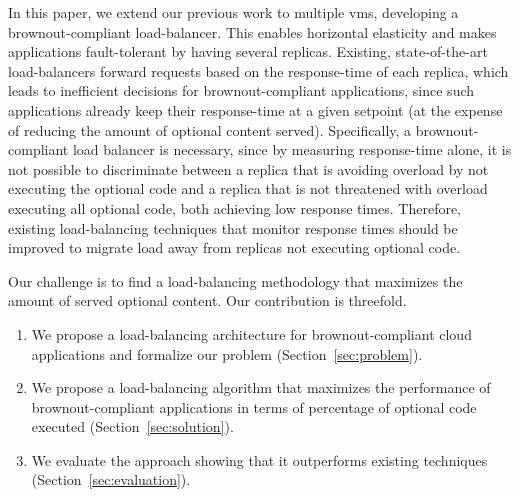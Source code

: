 In this paper, we extend our previous work to multiple \acp{vm},
developing a brownout-compliant load-balancer. This enables horizontal
elasticity and makes applications fault-tolerant by having several
replicas. Existing, state-of-the-art load-balancers forward requests based
on the response-time of each replica, which leads to inefficient
decisions for brownout-compliant applications, since such applications
already keep their response-time at a given setpoint (at the expense
of reducing the amount of optional content served). Specifically, a
brownout-compliant load balancer is necessary, since by measuring response-time alone,
it is not
possible to discriminate between a replica that is avoiding overload
by not executing the optional code and a replica that is not threatened with overload
executing all optional code, both achieving low response times.
Therefore, existing load-balancing techniques that monitor
response times should be
improved to migrate load away from replicas not executing optional code.

Our challenge is to find a load-balancing methodology that maximizes
the amount of served optional content. Our contribution is threefold.
\begin{enumerate}
\item We propose a load-balancing architecture for brownout-compliant cloud applications and
formalize our problem (Section~\ref{sec:problem}).
\item We propose a load-balancing algorithm that maximizes the
  performance of brownout-compliant applications in terms of
  percentage of optional code executed (Section~\ref{sec:solution}).
\item We evaluate the approach showing that it outperforms existing techniques
  (Section~\ref{sec:evaluation}).
\end{enumerate}

